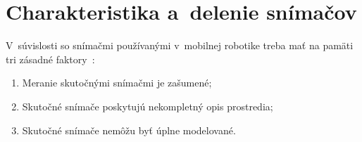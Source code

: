 
\section{Charakteristika a~delenie snímačov}

  V~súvislosti so snímačmi používanými v~mobilnej robotike treba mať na pamäti tri zásadné faktory~\cite{duchonSnimaceMobilnejRobotike2012}:
  \begin{enumerate}
    \item Meranie skutočnými snímačmi je zašumené;
    \item Skutočné snímače poskytujú nekompletný opis prostredia;
    \item Skutočné snímače nemôžu byť úplne modelované.
  \end{enumerate}

